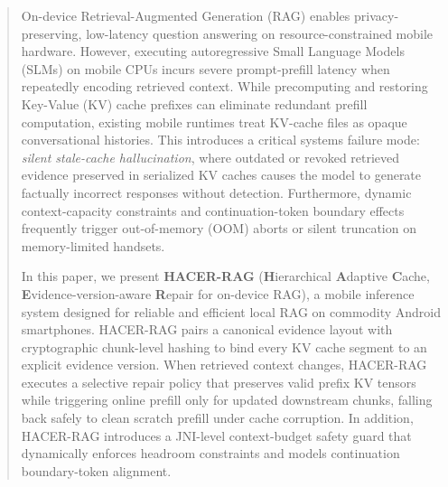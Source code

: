 \begin{abstract}
On-device Retrieval-Augmented Generation (RAG) enables privacy-preserving, low-latency question answering on resource-constrained mobile hardware. However, executing autoregressive Small Language Models (SLMs) on mobile CPUs incurs severe prompt-prefill latency when repeatedly encoding retrieved context. While precomputing and restoring Key-Value (KV) cache prefixes can eliminate redundant prefill computation, existing mobile runtimes treat KV-cache files as opaque conversational histories. This introduces a critical systems failure mode: \emph{silent stale-cache hallucination}, where outdated or revoked retrieved evidence preserved in serialized KV caches causes the model to generate factually incorrect responses without detection. Furthermore, dynamic context-capacity constraints and continuation-token boundary effects frequently trigger out-of-memory (OOM) aborts or silent truncation on memory-limited handsets.

In this paper, we present \textbf{HACER-RAG} (\textbf{H}ierarchical \textbf{A}daptive \textbf{C}ache, \textbf{E}vidence-version-aware \textbf{R}epair for on-device RAG), a mobile inference system designed for reliable and efficient local RAG on commodity Android smartphones. HACER-RAG pairs a canonical evidence layout with cryptographic chunk-level hashing to bind every KV cache segment to an explicit evidence version. When retrieved context changes, HACER-RAG executes a selective repair policy that preserves valid prefix KV tensors while triggering online prefill only for updated downstream chunks, falling back safely to clean scratch prefill under cache corruption. In addition, HACER-RAG introduces a JNI-level context-budget safety guard that dynamically enforces headroom constraints and models continuation boundary-token alignment. 


\end{abstract}
